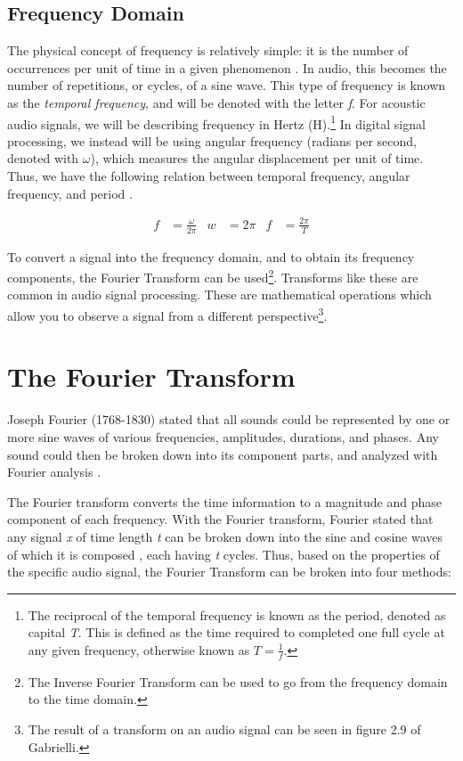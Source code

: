 \subsection{Frequency Domain}
The physical concept of frequency is relatively simple: it is the number of occurrences per unit of time in a given phenomenon \cite{Gabrielli_2020}. In audio, this becomes the number of repetitions, or cycles, of a sine wave. This type of frequency is known as the \textit{temporal frequency}, and will be denoted with the letter \textit{f}. For acoustic audio signals, we will be describing frequency in Hertz (H).\footnote{The reciprocal of the temporal frequency is known as the period, denoted as capital \textit{T}. This is defined as the time required to completed one full cycle at any given frequency, otherwise known as $T = \frac{1}{\textit{f}}$.} In digital signal processing, we instead will be using angular frequency (radians per second, denoted with $\omega$), which measures the angular displacement per unit of time. Thus, we have the following relation between temporal frequency, angular frequency, and period \cite{Gabrielli_2020}.

\begin{align}
    f &= \frac{\omega}{2\pi} &w &= 2\pi &f &= \frac{2\pi}{T}
\end{align}

To convert a signal into the frequency domain, and to obtain its frequency components, the Fourier Transform can be used\footnote{The Inverse Fourier Transform can be used to go from the frequency domain to the time domain.}. Transforms like these are common in audio signal processing. These are mathematical operations which allow you to observe a signal from a different perspective\footnote{The result of a transform on an audio signal can be seen in figure 2.9 of Gabrielli.}.

\section{The Fourier Transform}
Joseph Fourier (1768-1830) stated that all sounds could be represented by one or more sine waves of various frequencies, amplitudes, durations, and phases. Any sound could then be broken down into its component parts, and analyzed with Fourier analysis \cite{Winer_2018}. 

The Fourier transform converts the time information to a magnitude and phase component of each frequency. With the Fourier transform, Fourier stated that any signal \textit{x} of time length \textit{t} can be broken down into the sine and cosine waves of which it is composed \cite{Zjalic_2021}, each having \textit{t} cycles. Thus, based on the properties of the specific audio signal, the Fourier Transform can be broken into four methods:

